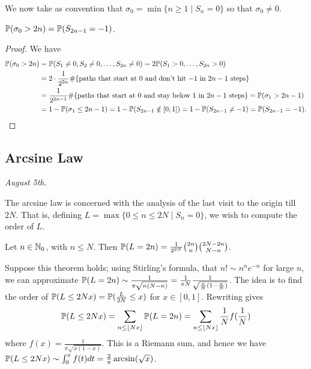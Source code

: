 We now take as convention that $\sigma_{0} = \min\{n \geq 1 \mid S_{n}=0\}$ so that $\sigma_{0} \neq 0$.

\begin{lemma}
    $\mathbb{P}(\sigma_{0}>2n) = \mathbb{P}(S_{2n-1}=-1)$.
\end{lemma}
\begin{proof}
    We have
    \begin{align}
        \mathbb{P}(\sigma_{0} > 2n) &= \mathbb{P}(S_{1} \neq 0, S_{2} \neq 0, \ldots, S_{2n} \neq 0) = 2\mathbb{P}(S_{1} > 0, \ldots, S_{2n} > 0) \notag \\
        &= 2 \cdot \frac{1}{2^{2n}} \#\{\text{paths that start at $0$ and don't hit $-1$ in $2n-1$ steps}\} \notag \\
        &= \frac{1}{2^{2n-1}} \#\{\text{paths that start at $0$ and stay below $1$ in $2n-1$ steps}\} = \mathbb{P}(\sigma_{1} > 2n-1) \notag \\
        &= 1-\mathbb{P}(\sigma_{1} \leq 2n-1) = 1-\mathbb{P}(S_{2n-1} \notin [0,1]) = 1-\mathbb{P}(S_{2n-1} \neq -1) = \mathbb{P}(S_{2n-1}=-1).
    \end{align}
\end{proof}

\subsection{Arcsine Law}
\textit{August 5th.}

The arcsine law is concerned with the analysis of the last visit to the origin till $2N$. That is, defining $L = \max\{0 \leq n \leq 2N \mid S_{n}=0\}$, we wish to compute the order of $L$.

\begin{theorem}
    Let $n \in \mathbb{N}_{0}$, with $n \leq N$. Then $\mathbb{P}(L = 2n) = \frac{1}{2^{2N}} \binom{2n}{n} \binom{2N-2n}{N-n}$.
\end{theorem}

\begin{remark}
    Suppose this theorem holds; using Stirling's formula, that $n! \sim n^{n}e^{-n}$ for large $n$, we can approximate $\mathbb{P}(L = 2n) \sim \frac{1}{\pi \sqrt{n(N-n)}} = \frac{1}{\pi N} \frac{1}{\sqrt{\frac{n}{N}(1-\frac{n}{N})}}$. The idea is to find the order of $\mathbb{P}(L \leq 2Nx) = \mathbb{P}(\frac{L}{2N} \leq x)$ for $x \in [0,1]$. Rewriting gives
    \begin{align}
        \mathbb{P}(L \leq 2Nx) = \sum_{n \leq \left\lfloor Nx \right\rfloor} \mathbb{P}(L = 2n) = \sum_{n \leq \left\lfloor Nx \right\rfloor} \frac{1}{N} f(\frac{1}{N})
    \end{align}
    where $f(x) = \frac{1}{\pi \sqrt{x(1-x)}}$. This is a Riemann sum, and hence we have $\mathbb{P}(L \leq 2Nx) \sim \int_{0}^{x} f(t) dt = \frac{2}{\pi} \arcsin(\sqrt{x})$.
\end{remark}

